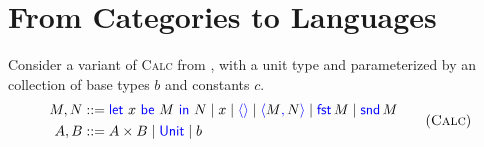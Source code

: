 





\chapter{From Categories to Languages}

Consider a variant of \textsc{Calc} from ,
with a unit type and parameterized by an collection of base types \(b\)
and constants \(c\).
\begin{gather}
  \begin{aligned}
  M,N &::= \pllet{x}{M}{N} \mid x \mid \plunit{} \mid \plpair{M}{N} \mid \plfst{M} \mid \plsnd{M} \\
  A,B &::= A \times B \mid \plUnit \mid b
  \end{aligned}
  \tag{\textsc{Calc}}
  \label{lang:calc}
\end{gather}

